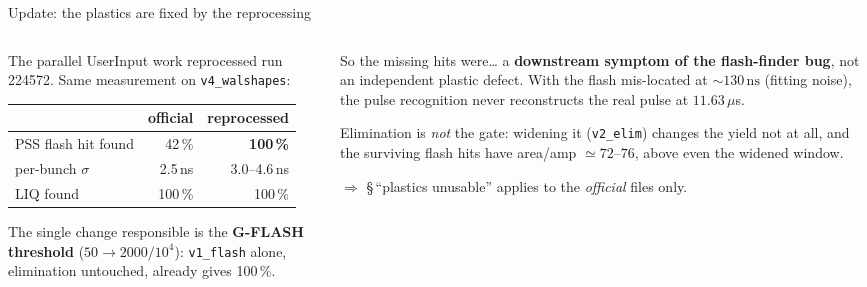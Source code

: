 \documentclass[aspectratio=169,10pt]{beamer}
\newcommand{\ns}{\,\mathrm{ns}}
\newcommand{\hl}[1]{\textcolor{orange!75!black}{\textbf{#1}}}
\begin{document}
\begin{frame}{Update: the plastics are fixed by the reprocessing}
\begin{columns}[T]
\begin{column}{0.5\textwidth}
The parallel UserInput work reprocessed run 224572. Same measurement on
\texttt{v4\_walshapes}:
\vspace{0.5em}

\small
\begin{tabular}{lrr}
\toprule
 & official & reprocessed \\
\midrule
PSS flash hit found & 42\,\% & \hl{100\,\%} \\
per-bunch $\sigma$ & 2.5\,ns & 3.0--4.6\,ns \\
LIQ found & 100\,\% & 100\,\% \\
\bottomrule
\end{tabular}
\vspace{0.8em}

{\footnotesize The single change responsible is the \hl{G-FLASH threshold}
($50\rightarrow2000/10^4$): \texttt{v1\_flash} alone, elimination untouched,
already gives 100\,\%.}
\end{column}
\begin{column}{0.5\textwidth}
\begin{block}{So the missing hits were\ldots}
{\small a \hl{downstream symptom of the flash-finder bug}, not an independent
plastic defect. With the flash mis-located at ${\sim}130\ns$ (fitting noise),
the pulse recognition never reconstructs the real pulse at $11.63\,\mu$s.}
\end{block}
\vspace{0.5em}
{\footnotesize Elimination is \emph{not} the gate: widening it
(\texttt{v2\_elim}) changes the yield not at all, and the surviving flash hits
have area/amp $\simeq72$--$76$, above even the widened window.}
\vspace{0.5em}

{\footnotesize $\Rightarrow$ \S\,``plastics unusable'' applies to the
\emph{official} files only.}
\end{column}
\end{columns}
\end{frame}
\end{document}
